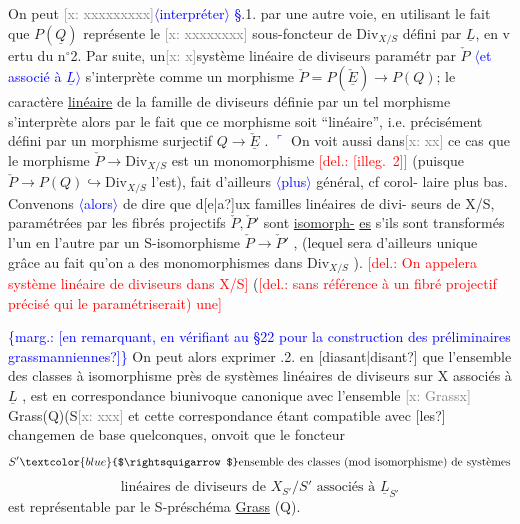 \documentclass[11pt]{article}
\newcommand{\scanpage}[1]{\par\bigskip\noindent{\small\sffamily[scan #1]}\par}
\newcommand{\mspage}[1]{{\small\sffamily[p.\,#1]}}
\newcommand{\hand}[1]{\textcolor{blue}{#1}}
\let\over\relax
\newcommand{\over}[2]{\textcolor{gray}{#1}\textcolor{blue}{\ensuremath{^{\!\nearrow}}#2}}
\newcommand{\inserted}[2][]{\textcolor{blue}{$\langle$#2$\rangle$}}
\newcommand{\margin}[1]{\textcolor{blue}{\{\textsf{marg.:} #1\}}}
\newcommand{\deleted}[1]{\textcolor{red}{[\textsf{del.:} #1]}}
\newcommand{\xout}[1]{\textcolor{gray}{[\textsf{x:} #1]}}
\newcommand{\uline}[1]{\underline{#1}}
\newcommand{\unsure}[1]{[#1?]}
\newcommand{\illegible}[1]{[\textsf{illeg.\ #1}]}
\begin{document}
On peut \xout{xxxxxxxxx}\inserted[typed]{interpréter} \hand{\S}.1. par une autre voie, en utilisant le fait
que $P(\underline{Q})$ représente le \xout{xxxxxxxx} sous-foncteur de $\mathrm{Div}_{X/S}$ défini par
$\underline{L}$, en v ertu du n$^{\circ}$2. Par suite, un\xout{x}système linéaire de diviseurs paramétr
par $\check{P}$ \inserted[typed]{et associé à $\underline{L}$} s'interprète comme un morphisme $\check{P} = P(\check{\underline{E}})\longrightarrow P(Q)$; le caractère
\uline{linéaire} de la famille de diviseurs définie par un tel morphisme
s'interprète alors par le fait que ce morphisme soit ``linéaire'', i.e.
précisément défini par un morphisme surjectif $Q\longrightarrow\check{\underline{E}}$ . \hand{$\ulcorner$} On voit aussi
dans\xout{xx} ce cas que le morphisme $\check{P}\longrightarrow\mathrm{Div}_{X/S}$ est un monomorphisme \deleted{\illegible{2}}
(puisque $\check{P}\longrightarrow P(Q)\hookrightarrow\mathrm{Div}_{X/S}$ l'est), fait d'ailleurs \inserted{plus} général, cf corol-%
laire plus bas. Convenons \inserted[typed]{alors} de dire que d\unsure{e|a}ux familles linéaires de divi-%
seurs de X/S, paramétrées par les fibrés projectifs $\check{P},\check{P}'$ sont \uline{isomorph-}%
\uline{es} s'ils sont transformés l'un en l'autre par un S-isomorphisme $\check{P}\longrightarrow\check{P}'$ ,
(lequel sera d'ailleurs unique grâce au fait qu'on a des monomorphismes
dans $\mathrm{Div}_{X/S}$ ). \deleted{On appelera système linéaire de diviseurs dans X/S}
(\deleted{sans référence à un fibré projectif précisé qui le paramétriserait) une}

\mspage{\hand{125}}

\clearpage
\scanpage{25/126}
\mspage{\hand{29}}

\margin{\unsure{en remarquant, en vérifiant au §22 pour la construction des préliminaires grassmanniennes}}
On peut alors exprimer \over{5}{4}.2. en \unsure{diasant|disant} que l'ensemble des classes
à isomorphisme près de systèmes linéaires de diviseurs sur X associés à
$\underline{L}$ , est en correspondance biunivoque canonique avec l'ensemble \xout{Grassx}
Grass(Q)(S\xout{xxx} et cette correspondance étant compatible avec \unsure{les} changemen
de base quelconques, onvoit que le foncteur
\[ S' \hand{$\rightsquigarrow$} \text{ensemble des classes (mod isomorphisme) de systèmes} \]
\[ \text{linéaires de diviseurs de } X_{S'}/S' \text{ associés à } \underline{L}_{S'} \]
est représentable par le S-préschéma \uline{Grass} (Q).
\end{document}
